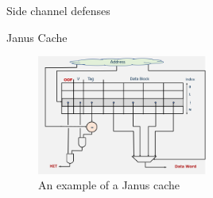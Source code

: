 \begin{section}{Side channel defenses}
\begin{subsection}{Janus Cache}
    \begin{figure}[h]
      \centering
      \includegraphics[width=0.5\textwidth]{img/hardware/janus cache.png}
      \caption{An example of a Janus cache}
    \end{figure}

  \end{subsection}

\end{section}


